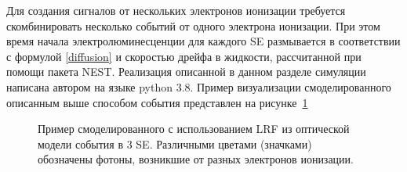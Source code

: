 Для создания сигналов от нескольких электронов ионизации требуется скомбинировать несколько событий от одного электрона ионизации. При этом время начала электролюминесценции для каждого SE размывается в соответствии с формулой \ref{diffusion} и скоростью дрейфа в жидкости, рассчитанной при помощи пакета NEST. Реализация описанной в данном разделе симуляции написана автором на языке python 3.8. Пример визуализации смоделированного описанным выше способом события представлен на рисунке~\ref{img:simulationevent}

\begin{figure}[H]
  \caption[Пример смоделированного с использованием LRF из оптической модели события в 3 SE.] {Пример смоделированного с использованием LRF из оптической модели события в 3 SE. Различными цветами (значками) обозначены фотоны, возникшие от разных электронов ионизации.}
  \label{img:simulationevent}  
\end{figure}